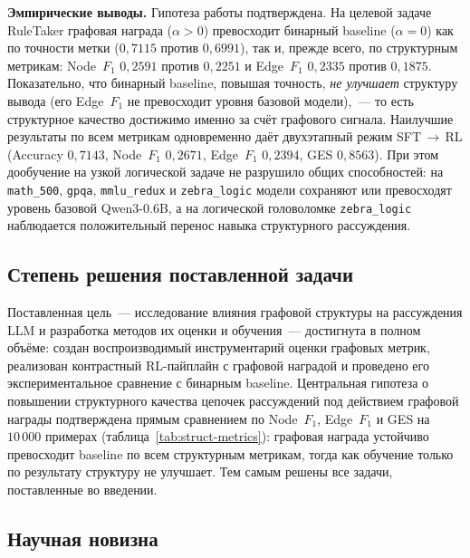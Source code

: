 \textbf{Эмпирические выводы.} Гипотеза работы подтверждена. На целевой задаче RuleTaker графовая награда ($\alpha>0$) превосходит бинарный baseline ($\alpha=0$) как по точности метки ($0{,}7115$ против $0{,}6991$), так и, прежде всего, по структурным метрикам: Node~$F_1$ $0{,}2591$ против $0{,}2251$ и Edge~$F_1$ $0{,}2335$ против $0{,}1875$. Показательно, что бинарный baseline, повышая точность, \emph{не улучшает} структуру вывода (его Edge~$F_1$ не превосходит уровня базовой модели),~--- то есть структурное качество достижимо именно за счёт графового сигнала. Наилучшие результаты по всем метрикам одновременно даёт двухэтапный режим SFT\,$\to$\,RL (Accuracy $0{,}7143$, Node~$F_1$ $0{,}2671$, Edge~$F_1$ $0{,}2394$, GES $0{,}8563$). При этом дообучение на узкой логической задаче не разрушило общих способностей: на \texttt{math\_500}, \texttt{gpqa}, \texttt{mmlu\_redux} и \texttt{zebra\_logic} модели сохраняют или превосходят уровень базовой Qwen3-0.6B, а на логической головоломке \texttt{zebra\_logic} наблюдается положительный перенос навыка структурного рассуждения.

\subsection{Степень решения поставленной задачи}
\label{subsec:conclusion-degree}

Поставленная цель~--- исследование влияния графовой структуры на рассуждения LLM и разработка методов их оценки и обучения~--- достигнута в полном объёме: создан воспроизводимый инструментарий оценки графовых метрик, реализован контрастный RL-пайплайн с графовой наградой и проведено его экспериментальное сравнение с бинарным baseline. Центральная гипотеза о повышении структурного качества цепочек рассуждений под действием графовой награды подтверждена прямым сравнением по Node~$F_1$, Edge~$F_1$ и GES на $10\,000$ примерах (таблица~\ref{tab:struct-metrics}): графовая награда устойчиво превосходит baseline по всем структурным метрикам, тогда как обучение только по результату структуру не улучшает. Тем самым решены все задачи, поставленные во введении.

\subsection{Научная новизна}
\label{subsec:conclusion-novelty}


